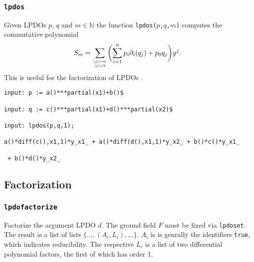 \documentclass[a4paper]{article}
\newcommand{\N}{\mathbb{N}}
\begin{document}
\subsubsection{\texttt{lpdos}}
Given LPDOs $p$, $q$ and $m\in\N$ the function
\texttt{lpdos($p$,$q$,$m$)} computes the commutative polynomial $$S_m
= \sum_{|j| = m\atop |j| < k} \biggl(\sum_{i = 1}^n
p_i \partial_i(q_j) + p_0 q_j\biggr)y^{j}.$$ This is useful for the
factorization of LPDOs \cite{LasarukSturm:08b}.
\begin{footnotesize}
\begin{verbatim}
input: p := a()***partial(x1)+b()$

input: q := c()***partial(x1)+d()***partial(x2)$

input: lpdos(p,q,1);

a()*diff(c(),x1,1)*y_x1_ + a()*diff(d(),x1,1)*y_x2_ + b()*c()*y_x1_

 + b()*d()*y_x2_
\end{verbatim}
\end{footnotesize}


\subsection{Factorization}

\subsubsection{\texttt{lpdofactorize}}
Factorize the argument LPDO $d$. The ground field $F$ must be fixed via
\texttt{lpdoset}. The result is a list of lists
$\{\dots,(A_i,L_i),\dots\}$. $A_i$ is is genrally the identifiers
\texttt{true}, which indicates reducibility. The respective $L_i$ is a
list of two differential polynomial factors, the first of which has
order 1.
\end{document}
